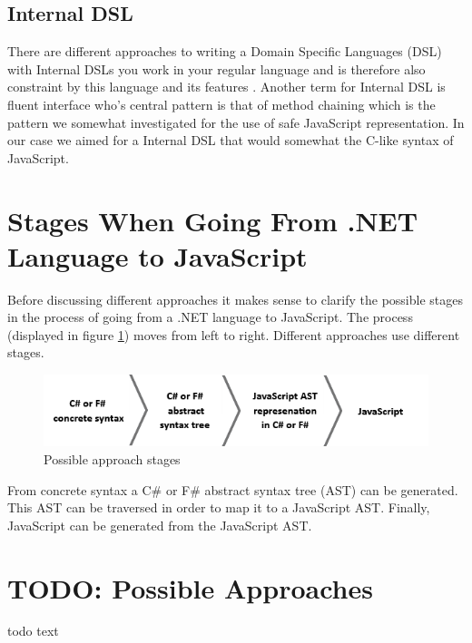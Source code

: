 	\subsection{Internal DSL} %
	\label{ssub:internal_dsl}
		There are different approaches to writing a Domain Specific Languages (DSL) with Internal DSLs you work in your regular language and is therefore also constraint by this language and its features \cite{domain_specific_languages}. Another term for Internal DSL is fluent interface who's central pattern is that of method chaining which is the pattern we somewhat investigated for the use of safe JavaScript representation. In our case we aimed for a Internal DSL that would somewhat the C-like syntax of JavaScript.

\section{Stages When Going From .NET Language to JavaScript} %
\label{sec:stages_when_going_from_net_language_to_javascript}
	Before discussing different approaches it makes sense to clarify the possible stages in the process of going from a .NET language to JavaScript. The process (displayed in figure \ref{stages}) moves from left to right. Different approaches use different stages.

				\begin{figure}[H]
			\begin{center}
				\centerline{\includegraphics[width=14cm]{resources/images/stages.png}}
			\end{center}
			\caption{Possible approach stages}
			\label{stages}
		\end{figure}

	 From concrete syntax a C\# or F\# abstract syntax tree (AST) can be generated. This AST can be traversed in order to map it to a JavaScript AST. Finally, JavaScript can be generated from the JavaScript AST.

\section{TODO: Possible Approaches} %
\label{sec:possible_approaches}
	todo text

